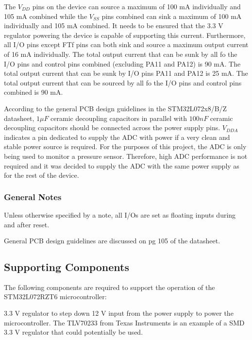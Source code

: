 The $V_{DD}$ pins on the device can source a maximum of 100 mA individually and 105 mA combined while the $V_{SS}$ pins combined can sink a maximum of 100 mA individually and 105 mA combined. It needs to be ensured that the 3.3 V regulator powering the device is capable of supporting this current. Furthermore, all I/O pins except FTf pins can both sink and source a maximum output current of 16 mA individually. The total output current that can be sunk by all fo the I/O pins and control pins combined (excluding PA11 and PA12) is 90 mA. The total output current that can be sunk by I/O pins PA11 and PA12 is 25 mA. The total output current that can be sourced by all fo the I/O pins and control pins combined is 90 mA.

According to the general PCB design guidelines in the STM32L072x8/B/Z datasheet, $1\mu F$ ceramic decoupling capacitors in parallel with $100 nF$ ceramic decoupling capacitors should be connected across the power supply pins. $V_{DDA}$ indicates a pin dedicated to supply the ADC with power if a very clean and stable power source is required. For the purposes of this project, the ADC is only being used to monitor a pressure sensor. Therefore, high ADC performance is not required and it was decided to supply the ADC with the same power supply as for the rest of the device.

\subsubsection{General Notes}


\begin{compactitem}
	\item Unless otherwise specified by a note, all I/Os are set as floating inputs during and after reset.
	\item General PCB design guidelines are discussed on pg 105 of the datasheet.
\end{compactitem}

\subsection{Supporting Components}

The following components are required to support the operation of the STM32L072RZT6 microcontroller:

\begin{compactitem}
	\item 3.3 V regulator to step down 12 V input from the power supply to power the microcontroller. The TLV70233 from Texas Instruments is an example of a \ac{SMD} 3.3 V regulator that could potentially be used.
\end{compactitem}

